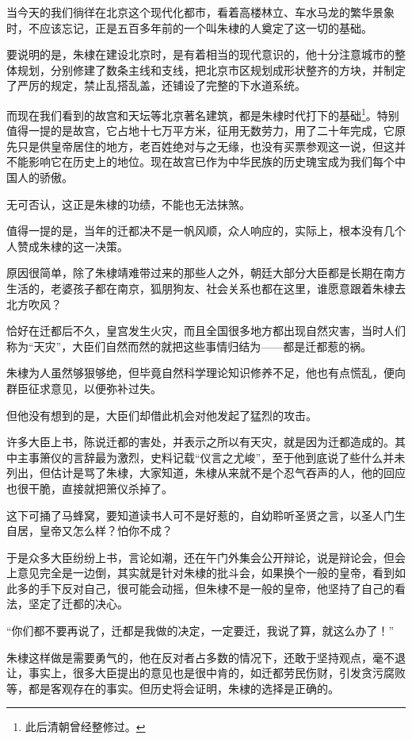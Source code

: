 \begin{multicols}{\theparacolNo}
当今天的我们徜徉在北京这个现代化都市，看着高楼林立、车水马龙的繁华景象时，不应该忘记，正是五百多年前的一个叫朱棣的人奠定了这一切的基础。

要说明的是，朱棣在建设北京时，是有着相当的现代意识的，他十分注意城市的整体规划，分别修建了数条主线和支线，把北京市区规划成形状整齐的方块，并制定了严厉的规定，禁止乱搭乱盖，还铺设了完整的下水道系统。

而现在我们看到的故宫和天坛等北京著名建筑，都是朱棣时代打下的基础\footnote{此后清朝曾经整修过。}。特别值得一提的是故宫，它占地十七万平方米，征用无数劳力，用了二十年完成，它原先只是供皇帝居住的地方，老百姓绝对与之无缘，也没有买票参观这一说，但这并不能影响它在历史上的地位。现在故宫已作为中华民族的历史瑰宝成为我们每个中国人的骄傲。

无可否认，这正是朱棣的功绩，不能也无法抹煞。

值得一提的是，当年的迁都决不是一帆风顺，众人响应的，实际上，根本没有几个人赞成朱棣的这一决策。

原因很简单，除了朱棣靖难带过来的那些人之外，朝廷大部分大臣都是长期在南方生活的，老婆孩子都在南京，狐朋狗友、社会关系也都在这里，谁愿意跟着朱棣去北方吹风？

恰好在迁都后不久，皇宫发生火灾，而且全国很多地方都出现自然灾害，当时人们称为“天灾”，大臣们自然而然的就把这些事情归结为——都是迁都惹的祸。

朱棣为人虽然够狠够绝，但毕竟自然科学理论知识修养不足，他也有点慌乱，便向群臣征求意见，以便弥补过失。

但他没有想到的是，大臣们却借此机会对他发起了猛烈的攻击。

许多大臣上书，陈说迁都的害处，并表示之所以有天灾，就是因为迁都造成的。其中主事箫仪的言辞最为激烈，史料记载“仪言之尤峻”，至于他到底说了些什么并未列出，但估计是骂了朱棣，大家知道，朱棣从来就不是个忍气吞声的人，他的回应也很干脆，直接就把箫仪杀掉了。

这下可捅了马蜂窝，要知道读书人可不是好惹的，自幼聆听圣贤之言，以圣人门生自居，皇帝又怎么样？怕你不成？

于是众多大臣纷纷上书，言论如潮，还在午门外集会公开辩论，说是辩论会，但会上意见完全是一边倒，其实就是针对朱棣的批斗会，如果换个一般的皇帝，看到如此多的手下反对自己，很可能会动摇，但朱棣不是一般的皇帝，他坚持了自己的看法，坚定了迁都的决心。

“你们都不要再说了，迁都是我做的决定，一定要迁，我说了算，就这么办了！”

朱棣这样做是需要勇气的，他在反对者占多数的情况下，还敢于坚持观点，毫不退让，事实上，很多大臣提出的意见也是很中肯的，如迁都劳民伤财，引发贪污腐败等，都是客观存在的事实。但历史将会证明，朱棣的选择是正确的。


\end{multicols}
